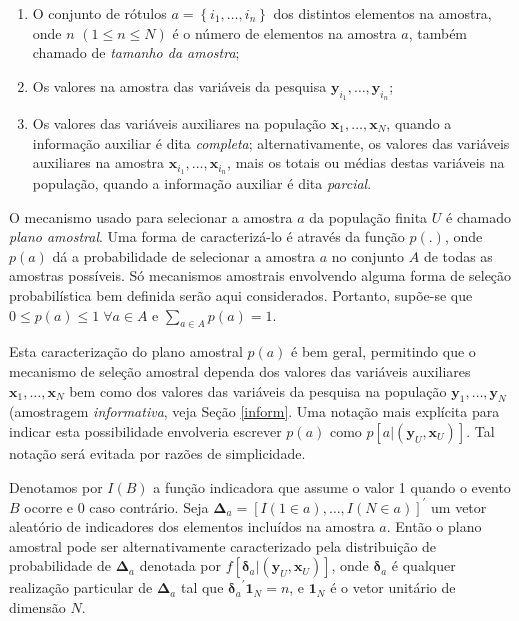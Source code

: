 \documentclass[
  12pt,
  brazilian,
]{book}
\theoremstyle{definition}
\theoremstyle{definition}
\theoremstyle{definition}
\theoremstyle{definition}
\theoremstyle{remark}
\begin{document}
\begin{enumerate}
\def\labelenumi{\arabic{enumi}.}
\item
  O conjunto de rótulos \(a=\left\{ i_1 , \ldots, i_n \right\}\) dos distintos
  elementos na amostra, onde \(n\) \(\left( 1 \leq n \leq N \right)\) é o número
  de elementos na amostra \(a\), também chamado de \emph{tamanho da amostra};
\item
  Os valores na amostra das variáveis da pesquisa
  \(\mathbf{y}_{i_1} ,\ldots, \mathbf{y}_{i_n}\);
\item
  Os valores das variáveis auxiliares na população
  \(\mathbf{x}_1 ,\ldots, \mathbf{x}_N\), quando a informação auxiliar é dita
  \emph{completa}; alternativamente, os valores das variáveis auxiliares na amostra
  \(\mathbf{x}_{i_1} ,\ldots, \mathbf{x}_{i_n}\), mais os totais ou médias
  destas variáveis na população, quando a informação auxiliar é dita
  \emph{parcial}.
\end{enumerate}

O mecanismo usado para selecionar a amostra \(a\) da população finita \(U\) é
chamado \emph{plano amostral}. Uma forma de caracterizá-lo é através da função
\(p\left( .\right)\), onde \(p(a)\) dá a probabilidade de selecionar a amostra \(a\)
no conjunto \(A\) de todas as amostras possíveis. Só mecanismos amostrais
envolvendo alguma forma de seleção probabilística bem definida serão aqui
considerados. Portanto, supõe-se que \(0 \leq p(a) \leq 1 \; \forall a \in A\) e
\(\sum_{a \in A} p(a)=1\).

Esta caracterização do plano amostral \(p(a)\) é bem geral, permitindo que o
mecanismo de seleção amostral dependa dos valores das variáveis auxiliares
\(\mathbf{x}_1 ,\ldots, \mathbf{x}_N\) bem como dos valores das variáveis da
pesquisa na população \(\mathbf{y}_1 ,\ldots, \mathbf{y}_N\) (amostragem
\emph{informativa}, veja Seção \ref{inform}. Uma notação mais explícita para indicar
esta possibilidade envolveria escrever \(p(a)\) como
\(p\left[ a | (\mathbf{y}_U , \mathbf{x}_U ) \right]\). Tal notação será evitada
por razões de simplicidade.

Denotamos por \(I(B)\) a função indicadora que assume o valor 1 quando o evento
\(B\) ocorre e 0 caso contrário. Seja
\(\mathbf{\Delta}_a = \left[ I(1 \in a) ,\ldots, I(N \in a)\right]^{\prime}\) um
vetor aleatório de indicadores dos elementos incluídos na amostra \(a\). Então o
plano amostral pode ser alternativamente caracterizado pela distribuição de
probabilidade de \(\mathbf{\Delta }_a\) denotada por
\(f\left[ \mathbf{\delta }_a | \left(\mathbf{y}_U , \mathbf{x}_U \right) \right]\),
onde \(\mathbf{\delta }_a\) é qualquer realização particular de
\(\mathbf{\Delta }_a\) tal que \({\mathbf{\delta}_a}^{\prime} \mathbf{1}_N = n\), e
\(\mathbf{1}_N\) é o vetor unitário de dimensão \(N\).
\end{document}
